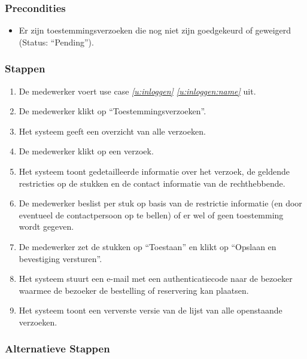 \documentclass[a4paper,titlepage]{report}
\def\namedref#1{\ref{#1} \ref{#1:name}}
\begin{document}
      \subsubsection{Precondities}
        \begin{itemize}
          \item Er zijn toestemmingsverzoeken die nog niet zijn goedgekeurd of
            geweigerd (Status: ``Pending'').
        \end{itemize}
      \subsubsection{Stappen}
        \begin{enumerate}
          \item De medewerker voert use case \textit{\namedref{u:inloggen}}
            uit.
          \item De medewerker klikt op ``Toestemmingsverzoeken''.
          \item Het systeem geeft een overzicht van alle verzoeken.
          \item De medewerker klikt op een verzoek.
          \item Het systeem toont gedetailleerde informatie over het verzoek,
            de geldende restricties op de stukken en de contact
            informatie van de rechthebbende.
          \item \label{u:toestemming_beslissen:beslissing} De medewerker
             beslist per stuk op basis van de restrictie informatie
            (en door eventueel de contactpersoon op te bellen) of er wel of
            geen toestemming wordt gegeven.
          \item De medewerker zet de stukken op ``Toestaan'' en klikt op
            ``Opslaan en bevestiging versturen''.
          \item Het systeem stuurt een e-mail met een authenticatiecode naar
            de bezoeker waarmee de bezoeker de bestelling of reservering kan
            plaatsen.
          \item \label{u:toestemming_beslissen:ververste_lijst} Het systeem
            toont een ververste versie van de lijst van alle
            openstaande verzoeken.
        \end{enumerate}
      \subsubsection{Alternatieve Stappen}
\end{document}
